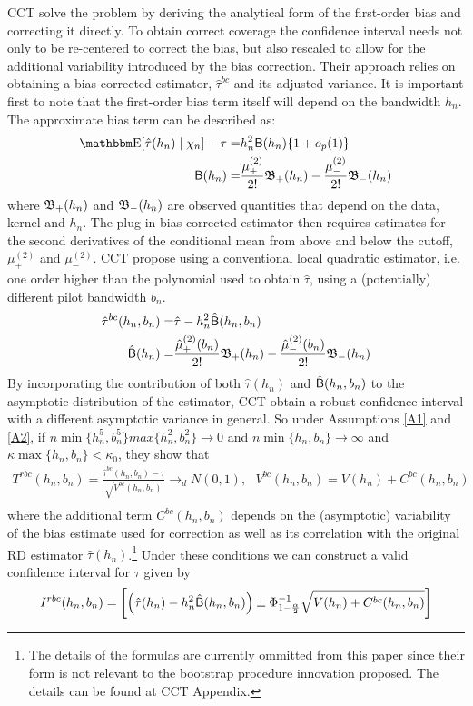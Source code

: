 \documentclass[12pt,fleqn]{article}
\begin{document}
CCT solve the problem by deriving the analytical form of the first-order bias and correcting it directly. To obtain correct coverage the confidence interval needs not only to be re-centered to correct the bias, but also rescaled to allow for the additional variability introduced by the bias correction. Their approach relies on obtaining a bias-corrected  estimator, $\hat{\tau}^{bc}$ and its adjusted variance. It is important first to note that the first-order bias term itself will depend on the bandwidth $h_{n}$. The approximate bias term can be described as:
\begin{align*}
     \E[\hat{\tau}(h_{n}) \mid \chi_{n}]-\tau=& h_{n}^{2}\Bs(h_{n})\{1+o_{p}(1)\}\\
     \Bs(h_{n})=&\frac{\mu_{+}^{(2)}}{2!}\Bf_{+}(h_{n})-\frac{\mu_{-}^{(2)}}{2!}\Bf_{-}(h_{n})
   \end{align*}
where $\mathfrak{B}_{+}(h_{n})$ and $\mathfrak{B}_{-}(h_{n})$ are observed quantities that depend on the data, kernel and $h_{n}$. The plug-in bias-corrected estimator then requires estimates for the second derivatives of the conditional mean from above and below the cutoff, $\mu_{+}^{(2)}$ and $\mu_{-}^{(2)}$. CCT propose using a conventional local quadratic estimator, i.e. one order higher than the polynomial used to obtain $\hat{\tau}$,  using a (potentially) different pilot bandwidth $b_{n}$.
\begin{align*}
     \hat{\tau}^{bc}(h_{n}, b_{n})=& \hat{\tau}-h_{n}^{2}\hat{\mathsf{B}}(h_{n},b_{n})\\
     \hat{\mathsf{B}}(h_{n})=&\frac{\hat{\mu}_{+}^{(2)}(b_{n})}{2!}\mathfrak{B}_{+}(h_{n})-\frac{\hat{\mu}_{-}^{(2)}(b_{n})}{2!}\mathfrak{B}_{-}(h_{n})
   \end{align*}
By incorporating the contribution of both $\hat{\tau}(h_{n})$ and $\hat{\mathsf{B}}(h_{n},b_{n})$ to the asymptotic distribution of the estimator, CCT obtain a robust confidence interval with a different asymptotic variance in general. So under Assumptions \ref{A1} and \ref{A2}, if $n\min\{h_{n}^{5}, b_{n}^{5}\}max\{h_{n}^{2}, b_{n}^{2}\}\rightarrow 0$ and $n\min\{h_{n}, b_{n}\}\rightarrow \infty$ and $\kappa \max\{h_{n},b_{n}\}< \kappa_{0}$, they show that
\begin{align}
  T^{rbc}(h_{n}, b_{n})=\frac{\hat{\tau}^{bc}(h_{n}, b_{n})-\tau}{\sqrt{V^{bc}(h_{n}, b_{n})}}\rightarrow_{d}N(0,1), \text{        }V^{bc}(h_{n}, b_{n})=V(h_{n})+C^{bc}(h_{n}, b_{n})\\
 \end{align}
where the additional term $C^{bc}(h_{n}, b_{n})$ depends on the (asymptotic) variability of the bias estimate used for correction as well as its correlation with the original RD estimator $\hat{\tau}(h_{n})$.\footnote{The details of the formulas are currently ommitted from this paper since their form is not relevant to the bootstrap procedure innovation proposed. The details can be found at CCT Appendix.}  Under these conditions we can construct a valid confidence interval for $\tau$ given by
 \begin{align}
  I^{rbc}(h_{n}, b_{n})=\left[\left(\hat{\tau}(h_{n})-h_{n}^{2}\hat{\mathsf{B}}(h_{n},b_{n})\right)\pm \Phi^{-1}_{1-\frac{\alpha}{2}}\sqrt{V(h_{n})+C^{bc}(h_{n}, b_{n})} \right]
 \end{align}
\end{document}
